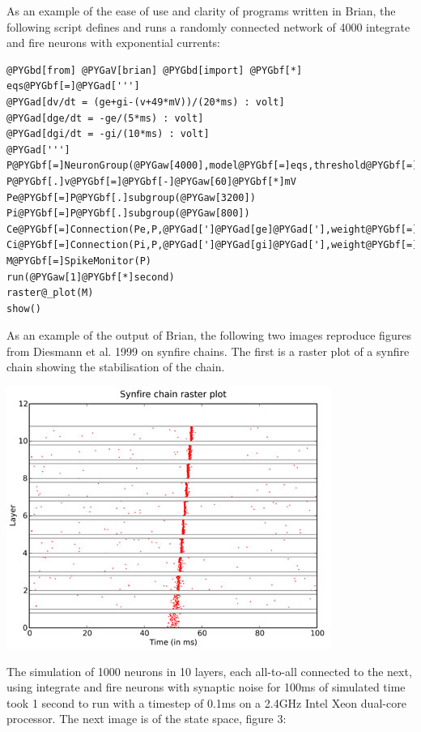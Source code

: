 \documentclass[letterpaper,10pt,english]{manual}
\begin{document}
As an example of the ease of use and clarity of programs written in Brian, the following script defines
and runs a randomly connected network of 4000 integrate and fire neurons with exponential currents:

\begin{Verbatim}[commandchars=@\[\]]
@PYGbd[from] @PYGaV[brian] @PYGbd[import] @PYGbf[*]
eqs@PYGbf[=]@PYGad[''']
@PYGad[dv/dt = (ge+gi-(v+49*mV))/(20*ms) : volt]
@PYGad[dge/dt = -ge/(5*ms) : volt]
@PYGad[dgi/dt = -gi/(10*ms) : volt]
@PYGad[''']
P@PYGbf[=]NeuronGroup(@PYGaw[4000],model@PYGbf[=]eqs,threshold@PYGbf[=]@PYGbf[-]@PYGaw[50]@PYGbf[*]mV,reset@PYGbf[=]@PYGbf[-]@PYGaw[60]@PYGbf[*]mV)
P@PYGbf[.]v@PYGbf[=]@PYGbf[-]@PYGaw[60]@PYGbf[*]mV
Pe@PYGbf[=]P@PYGbf[.]subgroup(@PYGaw[3200])
Pi@PYGbf[=]P@PYGbf[.]subgroup(@PYGaw[800])
Ce@PYGbf[=]Connection(Pe,P,@PYGad[']@PYGad[ge]@PYGad['],weight@PYGbf[=]@PYGaw[1.62]@PYGbf[*]mV,sparseness@PYGbf[=]@PYGaw[0.02])
Ci@PYGbf[=]Connection(Pi,P,@PYGad[']@PYGad[gi]@PYGad['],weight@PYGbf[=]@PYGbf[-]@PYGaw[9]@PYGbf[*]mV,sparseness@PYGbf[=]@PYGaw[0.02])
M@PYGbf[=]SpikeMonitor(P)
run(@PYGaw[1]@PYGbf[*]second)
raster@_plot(M)
show()
\end{Verbatim}

As an example of the output of Brian, the following two images reproduce figures from Diesmann et al. 1999
on synfire chains. The first is a raster plot of a synfire chain showing the stabilisation of the chain.

\includegraphics{synfirechain-example.jpg}

The simulation of 1000 neurons in 10 layers, each all-to-all connected to the next, using integrate and fire
neurons with synaptic noise for 100ms of simulated time took 1 second to run with a timestep of 0.1ms on a
2.4GHz Intel Xeon dual-core processor. The next image is of the state space, figure 3:
\end{document}
